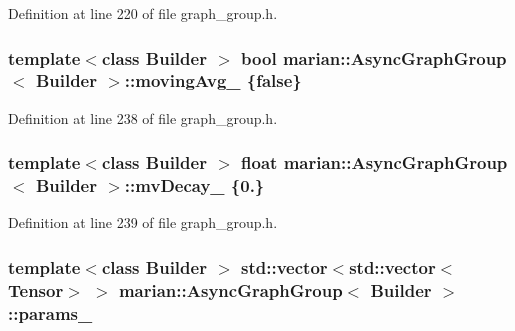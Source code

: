 Definition at line 220 of file graph\+\_\+group.\+h.

\subsubsection[{\texorpdfstring{moving\+Avg\+\_\+}{movingAvg_}}]{\setlength{\rightskip}{0pt plus 5cm}template$<$class Builder $>$ bool {\bf marian\+::\+Async\+Graph\+Group}$<$ Builder $>$\+::moving\+Avg\+\_\+ \{false\}\hspace{0.3cm}{\ttfamily [private]}}\hypertarget{classmarian_1_1AsyncGraphGroup_a96d6309b1924939d4b77ef1ed3a119d7}{}\label{classmarian_1_1AsyncGraphGroup_a96d6309b1924939d4b77ef1ed3a119d7}


Definition at line 238 of file graph\+\_\+group.\+h.

\subsubsection[{\texorpdfstring{mv\+Decay\+\_\+}{mvDecay_}}]{\setlength{\rightskip}{0pt plus 5cm}template$<$class Builder $>$ float {\bf marian\+::\+Async\+Graph\+Group}$<$ Builder $>$\+::mv\+Decay\+\_\+ \{0.\}\hspace{0.3cm}{\ttfamily [private]}}\hypertarget{classmarian_1_1AsyncGraphGroup_a63554b987fc4b0dcb408cf3987758d29}{}\label{classmarian_1_1AsyncGraphGroup_a63554b987fc4b0dcb408cf3987758d29}


Definition at line 239 of file graph\+\_\+group.\+h.

\subsubsection[{\texorpdfstring{params\+\_\+}{params_}}]{\setlength{\rightskip}{0pt plus 5cm}template$<$class Builder $>$ std\+::vector$<$std\+::vector$<${\bf Tensor}$>$ $>$ {\bf marian\+::\+Async\+Graph\+Group}$<$ Builder $>$\+::params\+\_\+\hspace{0.3cm}{\ttfamily [private]}}\hypertarget{classmarian_1_1AsyncGraphGroup_ad1bf15e55cc12b90d39012303b14767b}{}\label{classmarian_1_1AsyncGraphGroup_ad1bf15e55cc12b90d39012303b14767b}


